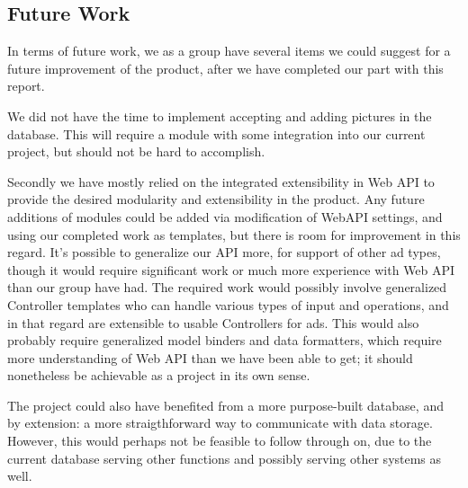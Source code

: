 \subsection{Future Work}

In terms of future work, we as a group have several items we could suggest for a future improvement of the product, after we have completed our part with this report.

We did not have the time to implement accepting and adding pictures in the database. This will require a module with some integration into our current project, but should not be
hard to accomplish.

Secondly we have mostly relied on the integrated extensibility in Web API to provide the desired modularity and extensibility in the product. Any future additions of modules could be
added via modification of WebAPI settings, and using our completed work as templates, but there is room for improvement in this regard. It's possible to generalize our API more, for support
of other ad types, though it would require significant work or much more experience with Web API than our group have had. The required work would possibly involve generalized Controller templates
who can handle various types of input and operations, and in that regard are extensible to usable Controllers for ads. This would also probably require generalized model binders and data formatters, which require more understanding of Web API than we have been able to get; it should nonetheless be achievable as a project in its own sense.

The project could also have benefited from a more purpose-built database, and by extension: a more straigthforward way to communicate with data storage. However, this would perhaps not be feasible to follow through on, due to the current database serving other functions and possibly serving other systems as well.
